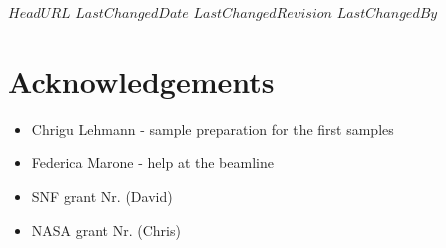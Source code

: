 \svnidlong
{$HeadURL$}
{$LastChangedDate$}
{$LastChangedRevision$}
{$LastChangedBy$}
\section{Acknowledgements}
\begin{itemize}
	\item Chrigu Lehmann - sample preparation for the first samples
	\item Federica Marone - help at the beamline
	\item SNF grant Nr. (David)
	\item NASA grant Nr. (Chris)
\end{itemize}